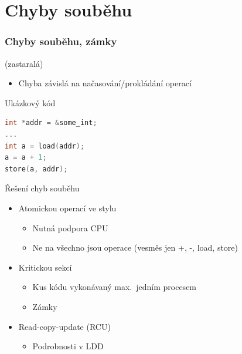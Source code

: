 
\iffimuni
\section{Chyby souběhu}
\fi

\begin{frame}[fragile]
  \frametitle{Chyby souběhu, zámky}

   (zastaralá)

  \bigskip

  \begin{itemize}
  \item Chyba závislá na načasování/prokládání operací
  \end{itemize}

  \medskip

  \begin{block}{Ukázkový kód}
  \begin{lstlisting}[language=C]
int *addr = &some_int;
...
int a = load(addr);
a = a + 1;
store(a, addr);
  \end{lstlisting}
  \end{block}

\end{frame}



\begin{frame}{Řešení chyb souběhu}

  \begin{itemize}
    \item Atomickou operací ve stylu 
    \begin{itemize}
      \item Nutná podpora CPU
      \item Ne na všechno jsou operace (vesměs jen +, -, load, store)
    \end{itemize}

    \pause

    \item Kritickou sekcí
    \begin{itemize}
      \item Kus kódu vykonávaný max.\ jedním procesem
      \item Zámky
    \end{itemize}

    \pause

    \item Read-copy-update (RCU)
    \begin{itemize}
      \item Podrobnosti v LDD
    \end{itemize}
  \end{itemize}
\end{frame}

